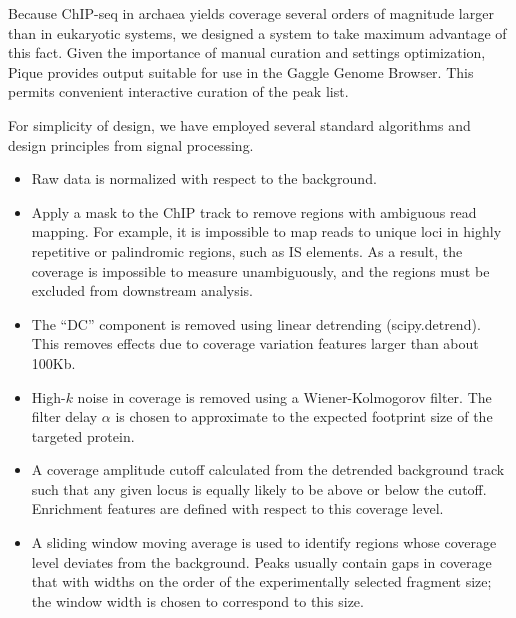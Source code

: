 \documentclass{article}
\begin{document}

Because ChIP-seq in archaea yields coverage several orders of
magnitude larger than in eukaryotic systems, we designed a system to
take maximum advantage of this fact. Given the importance of manual
curation and settings optimization, Pique provides output suitable for
use in the Gaggle Genome Browser. This permits convenient interactive
curation of the peak list. 

For simplicity of design, we have employed several standard algorithms
and design principles from signal processing.

\begin{itemize}

\item Raw data is normalized with respect to the background.

\item Apply a mask to the ChIP track to remove regions with ambiguous
  read mapping. For example, it is impossible to map reads to unique
  loci in highly repetitive or palindromic regions, such as IS
  elements. As a result, the coverage is impossible to measure
  unambiguously, and the regions must be excluded from downstream
  analysis. 

\item The ``DC'' component is removed using linear detrending
  (scipy.detrend). This removes effects due to coverage variation
  features larger than about 100Kb.

\item High-$k$ noise in coverage is removed using a Wiener-Kolmogorov
  filter. The filter delay $\alpha$ is chosen to approximate to the
  expected footprint size of the targeted protein.

\item A coverage amplitude cutoff calculated from the detrended
  background track such that any given locus is equally likely to be
  above or below the cutoff. Enrichment features are defined with
  respect to this coverage level.

\item A sliding window moving average is used to identify regions
  whose coverage level deviates from the background. Peaks usually
  contain gaps in coverage that with widths on the order of the
  experimentally selected fragment size; the window width is chosen to
  correspond to this size.


\end{itemize}
\end{document}
